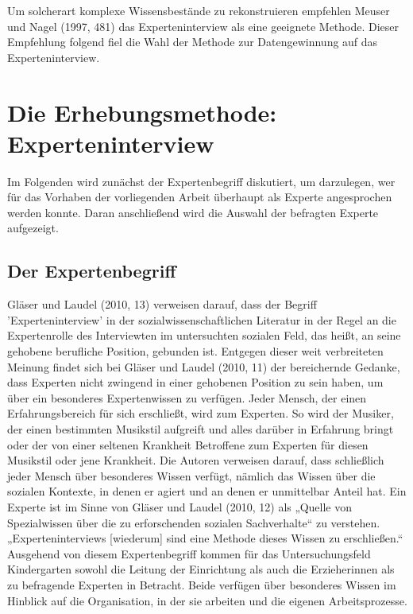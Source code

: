 Um solcherart komplexe Wissensbestände zu rekonstruieren empfehlen Meuser und Nagel (1997, 481) das Experteninterview als eine geeignete Methode. Dieser Empfehlung folgend fiel die Wahl der Methode zur Datengewinnung auf das Experteninterview. 


\section{Die Erhebungsmethode: Experteninterview}
Im Folgenden wird zunächst der Expertenbegriff diskutiert, um darzulegen, wer für das Vorhaben der vorliegenden Arbeit überhaupt als Experte angesprochen werden konnte.
Daran anschließend wird die Auswahl der befragten Experte aufgezeigt. 

\subsection{Der Expertenbegriff}
Gläser und Laudel (2010, 13) verweisen darauf, dass der Begriff ’Experteninterview’ in der sozialwissenschaftlichen Literatur in der Regel an die Expertenrolle des Interviewten im untersuchten sozialen Feld, das heißt, an seine gehobene berufliche Position, gebunden ist. Entgegen dieser weit verbreiteten Meinung findet sich bei Gläser und Laudel (2010, 11) der bereichernde Gedanke, dass Experten nicht zwingend in einer gehobenen Position zu sein haben, um über ein besonderes Expertenwissen zu verfügen. Jeder Mensch, der einen Erfahrungsbereich für sich erschließt, wird zum Experten. So wird der Musiker, der einen bestimmten Musikstil aufgreift und alles darüber in Erfahrung bringt oder der von einer seltenen Krankheit Betroffene zum Experten für diesen Musikstil oder jene Krankheit. Die Autoren verweisen darauf, dass schließlich jeder Mensch über besonderes Wissen verfügt, nämlich das Wissen über die sozialen Kontexte, in denen er agiert und an denen er unmittelbar Anteil hat. Ein Experte ist im Sinne von Gläser und Laudel (2010, 12) als „Quelle von Spezialwissen über die zu erforschenden sozialen Sachverhalte“ zu verstehen. „Experteninterviews [wiederum] sind eine Methode dieses Wissen zu erschließen.“ Ausgehend von diesem Expertenbegriff kommen für das Untersuchungsfeld Kindergarten sowohl die Leitung der Einrichtung als auch die Erzieherinnen als zu befragende Experten in Betracht. Beide verfügen über besonderes Wissen im Hinblick auf die Organisation, in der sie arbeiten und die eigenen Arbeitsprozesse.
 
